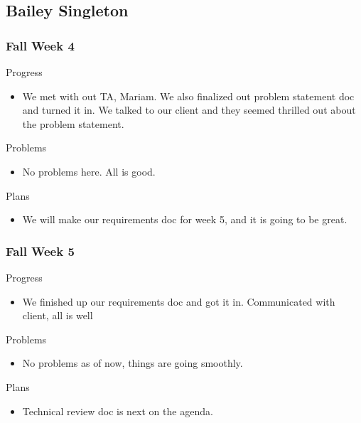 \subsection{Bailey Singleton}
        
    \subsubsection{Fall Week 4}
        \noindent
        Progress
        \begin{itemize}
            \item
            We met with out TA, Mariam. We also finalized out problem statement doc and turned it in. We talked to our client and they seemed thrilled out about the problem statement.
        \end{itemize}
        
        \noindent
        Problems
        \begin{itemize}
            \item
            No problems here. All is good.
        \end{itemize}
        
        \noindent
        Plans
        \begin{itemize}
            \item
            We will make our requirements doc for week 5, and it is going to be great.
        \end{itemize}

    \subsubsection{Fall Week 5}
        \noindent
        Progress
        \begin{itemize}
            \item
            We finished up our requirements doc and got it in. Communicated with client, all is well
        \end{itemize}
        
        \noindent
        Problems
        \begin{itemize}
            \item
            No problems as of now, things are going smoothly.
        \end{itemize}
        
        \noindent
        Plans
        \begin{itemize}
            \item
            Technical review doc is next on the agenda.
        \end{itemize}
